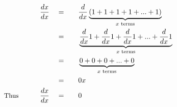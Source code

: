 \begin{alignat*}{5}
&\,&\frac{dx}{dx}\quad&=\quad&&\frac{d}{dx}\underbrace{(1+1+1+1+...+1)}_{x\text{ terms}}\\
&\,&\,&=&&\underbrace{\frac{d}{dx}1+\frac{d}{dx}1+\frac{d}{dx}1+...+\frac{d}{dx}1}_{x\text{ terms}}\\
&\,&\,&=&&\underbrace{0+0+0+...+0}_{x\text{ terms}}\\
&\,&\,&=&&0x\\
&\small\text{Thus}\normalsize\qquad&\frac{dx}{dx}\quad&=&&0
\end{alignat*}
